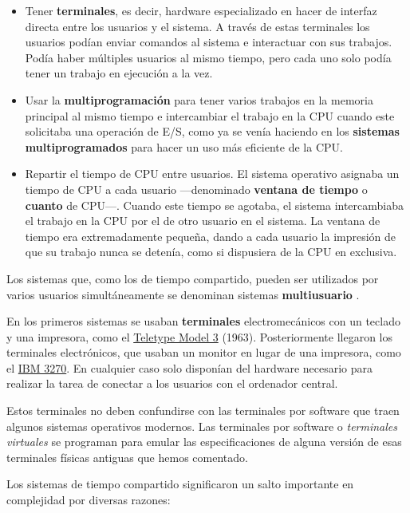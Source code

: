 \begin{itemize}
\item
  Tener \textbf{terminales}, es decir, hardware especializado en hacer
  de interfaz directa entre los usuarios y el sistema. A través de estas
  terminales los usuarios podían enviar comandos al sistema e
  interactuar con sus trabajos. Podía haber múltiples usuarios al mismo
  tiempo, pero cada uno solo podía tener un trabajo en ejecución a la
  vez.
\item
  Usar la \textbf{multiprogramación} para tener varios trabajos en la
  memoria principal al mismo tiempo e intercambiar el trabajo en la CPU
  cuando este solicitaba una operación de E/S, como ya se venía haciendo
  en los \textbf{sistemas multiprogramados} para hacer un uso más
  eficiente de la CPU.
\item
  Repartir el tiempo de CPU entre usuarios. El sistema operativo
  asignaba un tiempo de CPU a cada usuario ---denominado \textbf{ventana
  de tiempo} o \textbf{{}cuanto} de CPU---. Cuando este tiempo se
  agotaba, el sistema intercambiaba el trabajo en la CPU por el de otro
  usuario en el sistema. La ventana de tiempo era extremadamente
  pequeña, dando a cada usuario la impresión de que su trabajo nunca se
  detenía, como si dispusiera de la CPU en exclusiva.
\end{itemize}

Los sistemas que, como los de tiempo compartido, pueden ser utilizados
por varios usuarios simultáneamente se denominan sistemas
\textbf{{}multiusuario} {}.

En los primeros sistemas se usaban \textbf{{}terminales}
electromecánicos con un teclado y una impresora, como el
\href{https://en.wikipedia.org/wiki/Teletype_Model_33}{Teletype Model 3}
(1963). Posteriormente llegaron los terminales electrónicos, que usaban
un monitor en lugar de una impresora, como el
\href{https://es.wikipedia.org/wiki/IBM_3270}{IBM 3270}. En cualquier
caso solo disponían del hardware necesario para realizar la tarea de
conectar a los usuarios con el ordenador central.

Estos terminales no deben confundirse con las terminales por software
que traen algunos sistemas operativos modernos. Las terminales por
software o \emph{terminales virtuales} se programan para emular las
especificaciones de alguna versión de esas terminales físicas antiguas
que hemos comentado.

Los sistemas de tiempo compartido significaron un salto importante en
complejidad por diversas razones:

